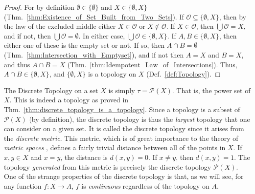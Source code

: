     \begin{proof}
        For by definition $\emptyset\in\{\emptyset\}$ and $X\in\{\emptyset,X\}$
        (Thm.~\ref{thm:Existence_of_Set_Built_from_Two_Sets}). If
        $\mathcal{O}\subseteq\{\emptyset,X\}$, then by the law of the excluded
        middle either $X\in\mathcal{O}$ or $X\notin\mathcal{O}$. If
        $X\in\mathcal{O}$, then $\bigcup\mathcal{O}=X$, and if not, then
        $\bigcup\mathcal{O}=\emptyset$. In either case,
        $\bigcup\mathcal{O}\in\{\emptyset,X\}$. If $A,B\in\{\emptyset,X\}$, then
        either one of these is the empty set or not. If so, then
        $A\cap{B}=\emptyset$ (Thm.~\ref{thm:Intersection_with_Emptyset}), and
        if not then $A=X$ and $B=X$, and thus $A\cap{B}=X$
        (Thm.~\ref{thm:Idempotent_Law_of_Intersections}). Thus,
        $A\cap{B}\in\{\emptyset,X\}$, and $\{\emptyset,X\}$ is a topology on $X$
        (Def.~\ref{def:Topology}).
    \end{proof}
    \begin{example}
        The Discrete Topology
        on a set $X$ is simply $\tau=\mathcal{P}(X)$. That is, the
        \gls{power set} of $X$. This is indeed a topology as
        proved in Thm.~\ref{thm:discrete_topology_is_a_topology}. Since a
        topology is a subset of $\mathcal{P}(X)$ (by definition), the discrete
        topology is thus the \textit{largest} topology that one can consider on
        a given set. It is called the discrete topology since it arises from the
        \textit{discrete metric}. This metric, which is
        of great importance to the theory of \textit{metric spaces}%
        , defines a fairly trivial distance between all of
        the points in $X$. If $x,y\in{X}$ and $x=y$, the distance is
        $d(x,y)=0$. If $x\ne{y}$, then $d(x,y)=1$. The topology
        \textit{generated} from this metric
        is precisely the discrete topology $\mathcal{P}(X)$. One of the strange
        properties of the discrete topology is that, as we will see, for any
        function $f:X\rightarrow{A}$, $f$ is \textit{continuous}%
        regardless of the topology on $A$.
    \end{example}
